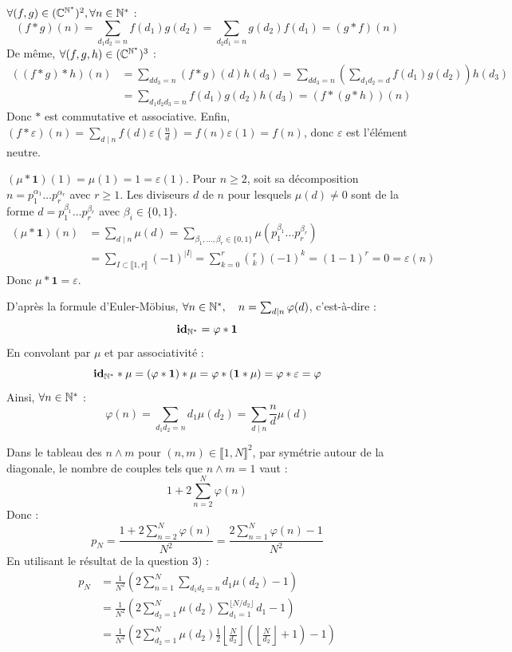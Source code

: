 \begin{solution}
$\forall (f,g) \in (\mathbb{C}^{\mathbb N^*})^2, \forall n \in \mathbb N^*$ :
\[ (f*g)(n) = \sum_{d_1 d_2 = n} f(d_1) g(d_2) = \sum_{d_2 d_1 = n} g(d_2) f(d_1) = (g*f)(n) \]
De même, $\forall (f,g,h) \in (\mathbb{C}^{\mathbb N^*})^3$ :
\begin{align*}
((f*g)*h)(n) &= \sum_{d d_3 = n} (f*g)(d) h(d_3) = \sum_{d d_3 = n} \left( \sum_{d_1 d_2 = d} f(d_1) g(d_2) \right) h(d_3) \\
&= \sum_{d_1 d_2 d_3 = n} f(d_1) g(d_2) h(d_3) = (f*(g*h))(n)
\end{align*}
Donc $*$ est commutative et associative.
Enfin, $(f*\varepsilon)(n) = \sum_{d \mid n} f(d) \varepsilon\left(\frac{n}{d}\right) = f(n) \varepsilon(1) = f(n)$, donc $\varepsilon$ est l'élément neutre.

$(\mu * \mathbf{1})(1) = \mu(1) = 1 = \varepsilon(1)$.
Pour $n \geq 2$, soit sa décomposition $n = p_1^{\alpha_1} \dots p_r^{\alpha_r}$ avec $r \geq 1$.
Les diviseurs $d$ de $n$ pour lesquels $\mu(d) \neq 0$ sont de la forme $d = p_1^{\beta_1} \dots p_r^{\beta_r}$ avec $\beta_i \in \{0, 1\}$.
\begin{align*}
(\mu * \mathbf{1})(n) &= \sum_{d \mid n} \mu(d) = \sum_{\beta_1, \dots, \beta_r \in \{0, 1\}} \mu(p_1^{\beta_1} \dots p_r^{\beta_r}) \\
&= \sum_{I \subset \llbracket 1, r \rrbracket} (-1)^{|I|} = \sum_{k=0}^r \binom{r}{k} (-1)^k = (1-1)^r = 0 = \varepsilon(n)
\end{align*}
Donc $\boxed{\mu * \mathbf{1} = \varepsilon}$.

D'après la formule d'Euler-Möbius, $\forall n \in \mathbb N^*, \quad n = \sum_{d \mid n} \varphi(d)$, c'est-à-dire :
\[ \mathbf{id}_{\mathbb N^*} = \varphi * \mathbf{1} \]
En convolant par $\mu$ et par associativité :
\[ \mathbf{id}_{\mathbb N^*} * \mu = (\varphi * \mathbf{1}) * \mu = \varphi * (\mathbf{1} * \mu) = \varphi * \varepsilon = \varphi \]
Ainsi, $\forall n \in \mathbb N^*$ :
\[ \boxed{\varphi(n) = \sum_{d_1 d_2 = n} d_1 \mu(d_2) = \sum_{d \mid n} \frac{n}{d} \mu(d)} \]

Dans le tableau des $n \wedge m$ pour $(n,m) \in \llbracket 1, N \rrbracket^2$, par symétrie autour de la diagonale, le nombre de couples tels que $n \wedge m = 1$ vaut :
\[ 1 + 2 \sum_{n=2}^N \varphi(n) \]
Donc :
\[ p_N = \frac{1 + 2 \sum_{n=2}^N \varphi(n)}{N^2} = \frac{2 \sum_{n=1}^N \varphi(n) - 1}{N^2} \]
En utilisant le résultat de la question 3) :
\begin{align*}
p_N &= \frac{1}{N^2} \left( 2 \sum_{n=1}^N \sum_{d_1 d_2 = n} d_1 \mu(d_2) - 1 \right) \\
&= \frac{1}{N^2} \left( 2 \sum_{d_2=1}^N \mu(d_2) \sum_{d_1=1}^{\lfloor N/d_2 \rfloor} d_1 - 1 \right) \\
&= \frac{1}{N^2} \left( 2 \sum_{d_2=1}^N \mu(d_2) \frac{1}{2} \left\lfloor \frac{N}{d_2} \right\rfloor \left( \left\lfloor \frac{N}{d_2} \right\rfloor + 1 \right) - 1 \right)
\end{align*}


\end{solution}
